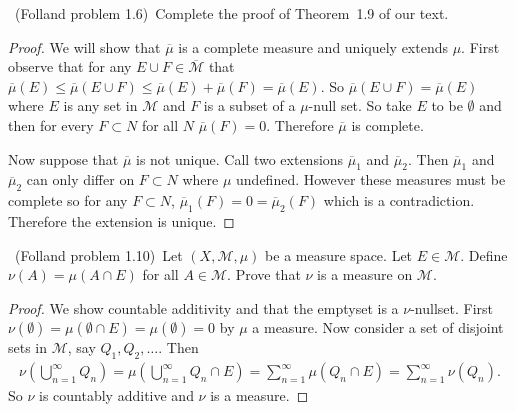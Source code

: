 \documentclass[11pt]{amsart}
\def\scriptm{{\mathcal M}}
\begin{document}
\medskip {}\ 
(Folland problem 1.6)\
Complete the proof of Theorem~1.9 of our text.
\begin{proof}
	We will show that $\overline{\mu}$ is a complete measure and uniquely extends $\mu.$ First observe that for any $E \cup F \in \overline{\scriptm}$ that $\overline{\mu}(E)\leq \overline{\mu}(E\cup F) \leq \overline{\mu}(E) + \overline{\mu}(F) = \overline{\mu}(E)$. So $\overline{\mu}(E \cup F) = \overline{\mu}(E)$ where $E$ is any set in $\scriptm$ and $F$ is a subset of a $\mu$-null set. So take $E$ to be $\emptyset$ and then for every $F \subset N$ for all $N$ $\overline{\mu}(F) = 0.$ Therefore $\overline{\mu}$ is complete.

	Now suppose that $\overline{\mu}$ is not unique. Call two extensions $\overline{\mu}_1$ and $\overline{\mu}_2$. Then $\overline{\mu}_1$ and $\overline{\mu}_2$ can only differ on $F \subset N$ where $\mu$ undefined. However these measures must be complete so for any $F \subset N$, $\overline{\mu}_1(F) = 0 = \overline{\mu}_2(F)$ which is a contradiction. Therefore the extension is unique.
\end{proof}

\medskip {}\ 
(Folland problem 1.10)\
Let $(X,\scriptm,\mu)$ be a measure space. Let $E\in\scriptm$.
Define $\nu(A)=\mu(A\cap E)$ for all $A\in\scriptm$.
Prove that $\nu$ is a measure on $\scriptm$.
\begin{proof}
	We show countable additivity and that the emptyset is a $\nu$-nullset. First $\nu(\emptyset) = \mu(\emptyset \cap E) = \mu(\emptyset) = 0$ by $\mu$ a measure. Now consider a set of disjoint sets in $\scriptm$, say $Q_1, Q_2, \dots$. Then
	\begin{equation*}
	\begin{aligned}
		\nu\left(\bigcup_{n=1}^\infty Q_n\right) =\mu\left(\bigcup_{n=1}^\infty Q_n \cap E\right) = \sum_{n=1}^\infty \mu\left(Q_n \cap E\right)  = \sum_{n=1}^\infty \nu(Q_n).
	\end{aligned}
	\end{equation*}
	So $\nu$ is countably additive and $\nu$ is a measure.
\end{proof}
\end{document}

